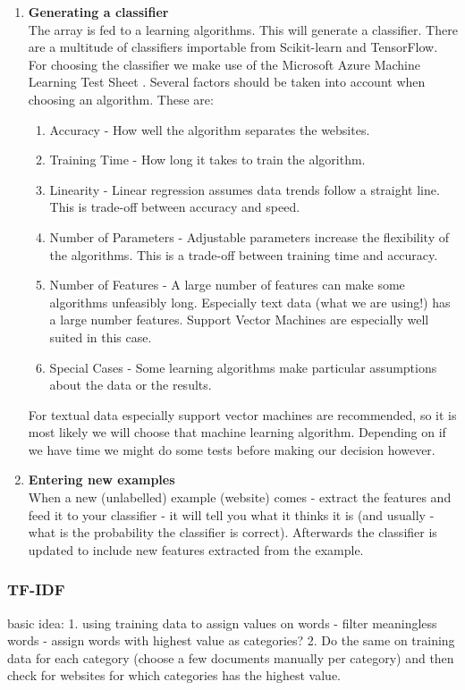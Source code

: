 \begin{enumerate}
    \item \textbf{Generating a classifier} \\
    The array is fed to a learning algorithms. This will generate a classifier. There are a multitude of classifiers importable from Scikit-learn and TensorFlow. For choosing the classifier we make use of the Microsoft Azure Machine Learning Test Sheet \cite{MLCheatSheet}. Several factors should be taken into account when choosing an algorithm. These are:
    \begin{enumerate}
        \item Accuracy - How well the algorithm separates the websites.
        \item Training Time - How long it takes to train the algorithm.
        \item Linearity - Linear regression assumes data trends follow a straight line. This is trade-off between accuracy and speed.
        \item Number of Parameters - Adjustable parameters increase the flexibility of the algorithms. This is a trade-off between training time and accuracy.
        \item Number of Features - A large number of features can make some algorithms unfeasibly long. Especially text data (what we are using!) has a large number features. Support Vector Machines are especially well suited in this case.
        \item Special Cases - Some learning algorithms make particular assumptions about the data or the results.
    \end{enumerate}
    
    For textual data especially support vector machines are recommended, so it is most likely we will choose that machine learning algorithm. Depending on if we have time we might do some tests before making our decision however.
    
    \item \textbf{Entering new examples} \\
    When a new (unlabelled) example (website) comes - extract the features and feed it to your classifier - it will tell you what it thinks it is (and usually - what is the probability the classifier is correct). Afterwards the classifier is updated to include new features extracted from the example.
\end{enumerate}

\subsubsection{TF-IDF}
basic idea: 1. using training data to assign values on words - filter meaningless words - assign words with highest value as categories? 2. Do the same on training data for each category (choose a few documents manually per category) and then check for websites for which categories has the highest value.

